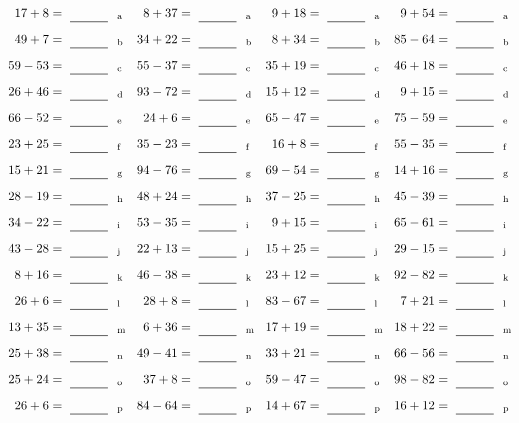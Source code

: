\documentclass
[
  draft    = true,
  fontsize = 11pt,
  parskip  = half-
]
{scrartcl}
\begin{document}
\clearpage
\begin{align*}
    \pline{17+8}&=\rline{a}
  & \pline{8+37}&=\rline{a}
  & \pline{9+18}&=\rline{a}
  & \pline{9+54}&=\rline{a} \\[1ex]
    \pline{49+7}&=\rline{b}
  & \pline{34+22}&=\rline{b}
  & \pline{8+34}&=\rline{b}
  & \pline{85-64}&=\rline{b} \\[1ex]
    \pline{59-53}&=\rline{c}
  & \pline{55-37}&=\rline{c}
  & \pline{35+19}&=\rline{c}
  & \pline{46+18}&=\rline{c} \\[1ex]
    \pline{26+46}&=\rline{d}
  & \pline{93-72}&=\rline{d}
  & \pline{15+12}&=\rline{d}
  & \pline{9+15}&=\rline{d} \\[1ex]
    \pline{66-52}&=\rline{e}
  & \pline{24+6}&=\rline{e}
  & \pline{65-47}&=\rline{e}
  & \pline{75-59}&=\rline{e} \\[1ex]
    \pline{23+25}&=\rline{f}
  & \pline{35-23}&=\rline{f}
  & \pline{16+8}&=\rline{f}
  & \pline{55-35}&=\rline{f} \\[1ex]
    \pline{15+21}&=\rline{g}
  & \pline{94-76}&=\rline{g}
  & \pline{69-54}&=\rline{g}
  & \pline{14+16}&=\rline{g} \\[1ex]
    \pline{28-19}&=\rline{h}
  & \pline{48+24}&=\rline{h}
  & \pline{37-25}&=\rline{h}
  & \pline{45-39}&=\rline{h} \\[1ex]
    \pline{34-22}&=\rline{i}
  & \pline{53-35}&=\rline{i}
  & \pline{9+15}&=\rline{i}
  & \pline{65-61}&=\rline{i} \\[1ex]
    \pline{43-28}&=\rline{j}
  & \pline{22+13}&=\rline{j}
  & \pline{15+25}&=\rline{j}
  & \pline{29-15}&=\rline{j} \\[1ex]
    \pline{8+16}&=\rline{k}
  & \pline{46-38}&=\rline{k}
  & \pline{23+12}&=\rline{k}
  & \pline{92-82}&=\rline{k} \\[1ex]
    \pline{26+6}&=\rline{l}
  & \pline{28+8}&=\rline{l}
  & \pline{83-67}&=\rline{l}
  & \pline{7+21}&=\rline{l} \\[1ex]
    \pline{13+35}&=\rline{m}
  & \pline{6+36}&=\rline{m}
  & \pline{17+19}&=\rline{m}
  & \pline{18+22}&=\rline{m} \\[1ex]
    \pline{25+38}&=\rline{n}
  & \pline{49-41}&=\rline{n}
  & \pline{33+21}&=\rline{n}
  & \pline{66-56}&=\rline{n} \\[1ex]
    \pline{25+24}&=\rline{o}
  & \pline{37+8}&=\rline{o}
  & \pline{59-47}&=\rline{o}
  & \pline{98-82}&=\rline{o} \\[1ex]
    \pline{26+6}&=\rline{p}
  & \pline{84-64}&=\rline{p}
  & \pline{14+67}&=\rline{p}
  & \pline{16+12}&=\rline{p}
\end{align*}
\end{document}
